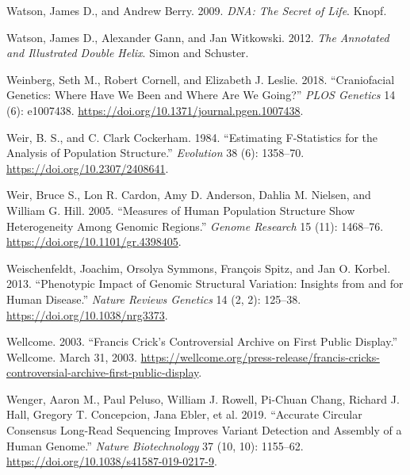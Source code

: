 \documentclass[
]{book}
\newlength{\cslhangindent}
\newlength{\cslentryspacingunit} %
\newenvironment{CSLReferences}[2] %
 {%
  \setlength{\parindent}{0pt}
  \ifodd #1
  \let\oldpar\par
  \def\par{\hangindent=\cslhangindent\oldpar}
  \fi
  \setlength{\parskip}{#2\cslentryspacingunit}
 }%
 {}
\begin{document}
\begin{CSLReferences}{1}{0}
\leavevmode{}%
Watson, James D., and Andrew Berry. 2009. \emph{{DNA}: {The} Secret of Life}. {Knopf}.

\leavevmode{}%
Watson, James D., Alexander Gann, and Jan Witkowski. 2012. \emph{The Annotated and Illustrated Double Helix}. {Simon and Schuster}.

\leavevmode{}%
Weinberg, Seth M., Robert Cornell, and Elizabeth J. Leslie. 2018. {``Craniofacial Genetics: {Where} Have We Been and Where Are We Going?''} \emph{PLOS Genetics} 14 (6): e1007438. \url{https://doi.org/10.1371/journal.pgen.1007438}.

\leavevmode{}%
Weir, B. S., and C. Clark Cockerham. 1984. {``Estimating {F-Statistics} for the {Analysis} of {Population Structure}.''} \emph{Evolution} 38 (6): 1358--70. \url{https://doi.org/10.2307/2408641}.

\leavevmode{}%
Weir, Bruce S., Lon R. Cardon, Amy D. Anderson, Dahlia M. Nielsen, and William G. Hill. 2005. {``Measures of Human Population Structure Show Heterogeneity Among Genomic Regions.''} \emph{Genome Research} 15 (11): 1468--76. \url{https://doi.org/10.1101/gr.4398405}.

\leavevmode{}%
Weischenfeldt, Joachim, Orsolya Symmons, François Spitz, and Jan O. Korbel. 2013. {``Phenotypic Impact of Genomic Structural Variation: Insights from and for Human Disease.''} \emph{Nature Reviews Genetics} 14 (2, 2): 125--38. \url{https://doi.org/10.1038/nrg3373}.

\leavevmode{}%
Wellcome. 2003. {``Francis {Crick}'s Controversial Archive on First Public Display.''} {Wellcome}. March 31, 2003. \url{https://wellcome.org/press-release/francis-cricks-controversial-archive-first-public-display}.

\leavevmode{}%
Wenger, Aaron M., Paul Peluso, William J. Rowell, Pi-Chuan Chang, Richard J. Hall, Gregory T. Concepcion, Jana Ebler, et al. 2019. {``Accurate Circular Consensus Long-Read Sequencing Improves Variant Detection and Assembly of a Human Genome.''} \emph{Nature Biotechnology} 37 (10, 10): 1155--62. \url{https://doi.org/10.1038/s41587-019-0217-9}.


\end{CSLReferences}
\end{document}
